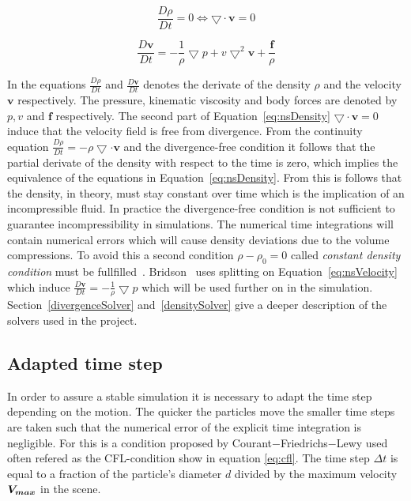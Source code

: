     \begin{equation} \label{eq:nsDensity}
        \frac{D\rho}{Dt} = 0 \Leftrightarrow \bigtriangledown \cdot \textbf{v} = 0 
    \end{equation}

    \begin{equation} \label{eq:nsVelocity}
        \frac{D\textbf{v}}{Dt} = -\frac{1}{\rho} \bigtriangledown p + v \bigtriangledown ^2 \textbf{v} + \frac{\textbf{f}}{\rho}
    \end{equation}

    In the equations $\frac{D\rho}{Dt}$ and $\frac{D\textbf{v}}{Dt}$ denotes the derivate of the density $\rho$ and the velocity $\textbf{v}$ respectively. The pressure, kinematic viscosity and body forces are denoted by $p,v$ and $\textbf{f}$ respectively. The second part of Equation~\ref{eq:nsDensity} $\bigtriangledown \cdot \textbf{v} = 0$ induce that the velocity field is free from divergence. From the continuity equation $\frac{D\rho}{Dt} = -\rho \bigtriangledown \cdot \textbf{v}$ and the divergence-free condition it follows that the partial derivate of the density with respect to the time is zero, which implies the equivalence of the equations in Equation~\ref{eq:nsDensity}. From this is follows that the density, in theory, must stay constant over time which is the implication of an incompressible fluid. In practice the divergence-free condition is not sufficient to guarantee incompressibility in simulations. The numerical time integrations will contain numerical errors which will cause density deviations due to the volume compressions. To avoid this a second condition $\rho - \rho_0 = 0$ called \textit{constant density condition} must be fullfilled~\cite{bender}. Bridson~\cite{bridson} uses splitting on Equation~\ref{eq:nsVelocity} which induce $\frac{D\textbf{v}}{Dt} = -\frac{1}{\rho} \bigtriangledown p$ which will be used further on in the simulation. Section~\ref{divergenceSolver} and~\ref{densitySolver} give a deeper description of the solvers used in the project.


\subsection{Adapted time step} \label{section:timestep}

In order to assure a stable simulation it is necessary to adapt the time step depending on the motion. 
The quicker the particles move the smaller time steps are taken such that the numerical 
error of the explicit time integration is negligible. For this is a condition proposed by 
Courant$-$Friedrichs$-$Lewy used often refered as the CFL-condition show in equation \ref{eq:cfl}. 
The time step $\Delta t$ is equal to a fraction of the particle's diameter $d$ divided by 
the maximum velocity $\bm{V_{max}}$ in the scene.

